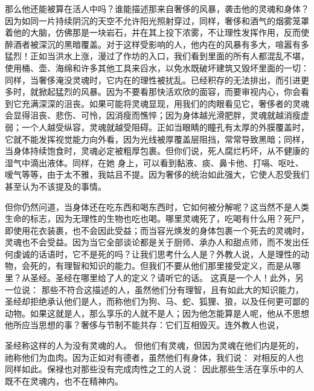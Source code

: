 那么他还能被算在活人中吗？谁能描述那来自奢侈的风暴，袭击他的灵魂和身体？因为如同一片持续阴沉的天空不允许阳光照射穿过，同样，奢侈和酒气的烟雾笼罩着他的大脑，仿佛那是一块岩石，并在其上投下浓雾，不让理性发挥作用，反而使醉酒者被深沉的黑暗覆盖。对于这样受影响的人，他内在的风暴有多大，喧嚣有多猛烈！正如当洪水上涨，漫过了作坊的入口，我们看到里面的所有人都混乱不堪，使用桶、壶、海绵和许多其他工具来舀水，以免水既破坏建筑又毁坏里面的一切：同样，当奢侈淹没灵魂时，它内在的理性被扰乱。已经积存的无法排出，而引进更多时，就掀起猛烈的风暴。因为不要看那快活欢欣的面容，而要审视内心，你会看到它充满深深的沮丧。如果可能将灵魂显现，用我们的肉眼看见它，奢侈者的灵魂会显得沮丧、悲伤、可怜，因消瘦而憔悴；因为身体越光滑肥胖，灵魂就越消瘦虚弱；一个人越受纵容，灵魂就越受阻碍。正如当眼睛的瞳孔有太厚的外膜覆盖时，它就不能发挥视觉能力向外看，因为光线被厚覆盖层阻挡，常常导致黑暗；同样，当身体持续饱食时，灵魂必定被粗厚包裹。但你们说，死人腐烂朽坏，从不健康的湿气中滴出液体。同样，在她  身上，可以看到黏液、痰、鼻卡他、打嗝、呕吐、嗳气等等，由于太不雅，我姑且不提。因为奢侈的统治如此强大，它使人忍受我们甚至认为不该提及的事情。\par

但你仍然问道，当身体还在吃东西和喝东西时，它如何被分解呢？这当然不是人类生命的标志，因为无理性的生物也吃也喝。哪里灵魂死了，吃喝有什么用？死尸，即使用花衣装裹，也不会因此受益；而当容光焕发的身体包裹一个死去的灵魂时，灵魂也不会受益。因为当它全部谈论都是关于厨师、承办人和甜点师，而不发出任何虔诚的话语时，它不是死的吗？让我们思考什么人是？外教人说，人是理性的动物，会死的，有理智和知识的能力。但我们不要从他们那里接受定义，而是从哪里？从圣经。圣经在哪里给了人的定义？请听它的话。  这真是一个人！此外，另一位说：  那些不符合这描述的人，虽然他们分有理智，且有如此大的知识能力，圣经却拒绝承认他们是人，而称他们为狗、马、蛇、狐狸、狼，以及任何更可鄙的动物。如果这就是人，那么享乐的人就不是人；因为他怎能算是人呢，他从不思想他所应当思想的事？奢侈与节制不能共存：它们互相毁灭。连外教人也说，\par

\par

圣经称这样的人为没有灵魂的人。 但他们有灵魂，但因为灵魂在他们内是死的，祂称他们为血肉。因为正如对有德者，虽然他们有身体，我们说： 对相反的人也同样如此。保禄也对那些没有完成肉性之工的人说： 因此那些生活在享乐中的人既不在灵魂内，也不在精神内。\par

